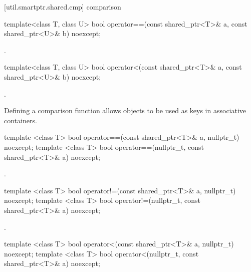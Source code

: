 [util.smartptr.shared.cmp]{ comparison}

%
\begin{itemdecl}
template<class T, class U>
  bool operator==(const shared_ptr<T>& a, const shared_ptr<U>& b) noexcept;
\end{itemdecl}

\begin{itemdescr}
\pnum
\returns {}.
\end{itemdescr}

%
\begin{itemdecl}
template<class T, class U>
  bool operator<(const shared_ptr<T>& a, const shared_ptr<U>& b) noexcept;
\end{itemdecl}

\begin{itemdescr}
\pnum
\returns {}.

\pnum
\begin{note}
Defining a comparison function allows  objects to be
used as keys in associative containers.
\end{note}
\end{itemdescr}

%
\begin{itemdecl}
template <class T>
  bool operator==(const shared_ptr<T>& a, nullptr_t) noexcept;
template <class T>
  bool operator==(nullptr_t, const shared_ptr<T>& a) noexcept;
\end{itemdecl}

\begin{itemdescr}
\pnum
\returns {}.
\end{itemdescr}

%
\begin{itemdecl}
template <class T>
  bool operator!=(const shared_ptr<T>& a, nullptr_t) noexcept;
template <class T>
  bool operator!=(nullptr_t, const shared_ptr<T>& a) noexcept;
\end{itemdecl}

\begin{itemdescr}
\pnum
\returns {}.
\end{itemdescr}

%
\begin{itemdecl}
template <class T>
  bool operator<(const shared_ptr<T>& a, nullptr_t) noexcept;
template <class T>
  bool operator<(nullptr_t, const shared_ptr<T>& a) noexcept;
\end{itemdecl}

